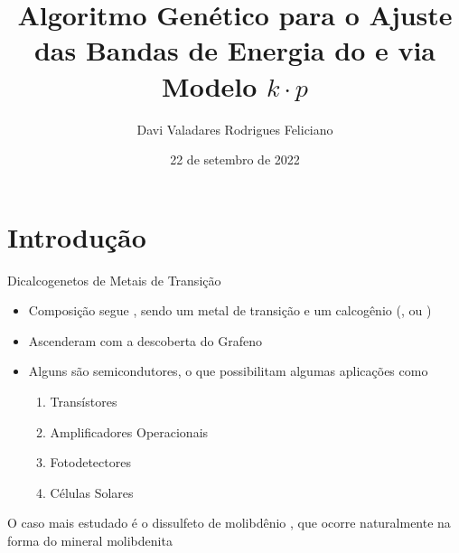 

\title[Defesa de Trabalho de Conclusão de Curso]
{Algoritmo Genético para o Ajuste das Bandas de Energia do  e  via Modelo $k \cdot p$}
\author{Davi Valadares Rodrigues Feliciano}
\date{22 de setembro de 2022}



\section{Introdução}

\begin{frame}
  \maketitle
\end{frame}

\begin{frame}{Dicalcogenetos de Metais de Transição}
  \begin{itemize}
    \item Composição segue , sendo  um metal de transição e 
          um calcogênio (,  ou )
    \item Ascenderam com a descoberta do Grafeno
    \item Alguns são semicondutores, o que possibilitam algumas aplicações como
          \begin{enumerate}
            \item Transístores
            \item Amplificadores Operacionais
            \item Fotodetectores
            \item Células Solares
          \end{enumerate}
  \end{itemize}
  \begin{block}{}
    \centering
    O caso mais estudado é o dissulfeto de molibdênio , que ocorre
    naturalmente na forma do mineral molibdenita
  \end{block}
\end{frame}

